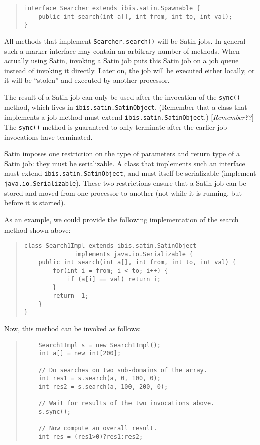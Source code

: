 \documentclass[10pt]{article}
\newcommand{\remark}[1]{[\emph{#1}]}
\begin{document}
\begin{quote}
\begin{verbatim}
interface Searcher extends ibis.satin.Spawnable {
    public int search(int a[], int from, int to, int val);
}
\end{verbatim}
\end{quote}
\noindent
All methods that implement \verb+Searcher.search()+ will be Satin jobs.
In general such a marker interface may contain an arbitrary number
of methods.
When actually using Satin, invoking a Satin job puts this Satin job
on a job queue instead of invoking it directly.
Later on, the job will be executed either locally, or it will be
``stolen'' and executed by another processor.

The result of a Satin job can only be used after the invocation
of the \verb+sync()+ method, which lives in \verb+ibis.satin.SatinObject+.
(Remember that a class that implements a job method must extend
\verb+ibis.satin.SatinObject+.) \remark{Remember??} The \verb+sync()+
method is guaranteed to only terminate after the earlier job
invocations have terminated.

Satin imposes one restriction on the type of parameters and return type
of a Satin job: they must be serializable.
A class that implements such an interface must extend
\verb+ibis.satin.SatinObject+, and must itself be serializable
(implement \verb+java.io.Serializable+).
These two restrictions ensure that a Satin job can be stored and
moved from one processor to another (not while it is running, but before
it is started).

As an example, we could provide the following implementation of the
search method shown above:

\begin{quote}
\begin{verbatim}
class Search1Impl extends ibis.satin.SatinObject
              implements java.io.Serializable {
    public int search(int a[], int from, int to, int val) {
        for(int i = from; i < to; i++) {
            if (a[i] == val) return i;
        }
        return -1;
    }
}
\end{verbatim}
\end{quote}

Now, this method can be invoked as follows:

\begin{quote}
\begin{verbatim}
    Search1Impl s = new Search1Impl();
    int a[] = new int[200];

    // Do searches on two sub-domains of the array.
    int res1 = s.search(a, 0, 100, 0);
    int res2 = s.search(a, 100, 200, 0);

    // Wait for results of the two invocations above.
    s.sync();

    // Now compute an overall result.
    int res = (res1>0)?res1:res2;
\end{verbatim}
\end{quote}
\end{document}
